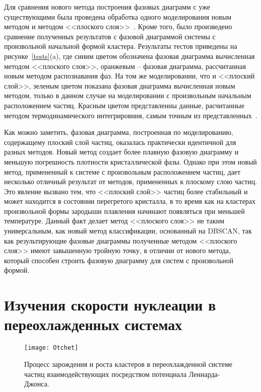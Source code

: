 Для сравнения нового метода построения фазовых диаграмм с уже существующими была проведена обработка одного моделирования новым методом и методом <<плоского слоя>>~\cite{10.1021/jp806127j, 10.1021/jp1117213}.
Кроме того, было произведено сравнение полученных результатов с фазовой диаграммой системы с произвольной начальной формой кластера.
Результаты тестов приведены на рисунке~\ref{tests}(a), где синим цветом обозначена фазовая диаграмма вычисленная методом <<плоского слоя>>, оранжевым -- фазовая диаграмма, рассчитанная новым методом распознавания фаз.
На том же моделировании, что и <<плоский слой>>, зеленым цветом показана фазовая диаграмма вычисленная новым методом, только в данном случае на моделировании с произвольным начальным расположением частиц.
Красным цветом представленны данные, расчитанные методом термодинамического интегрировния, самым точным из представленных~\cite{10.1080/00268976.2019.1699185}.

Как можно заметить, фазовая диаграмма, построенная по моделированию, содержащему плоский слой частиц, оказалась практически идентичной для разных методов.
Новый метод создает более плавную фазовую диаграмму и меньшую погрешность плотности кристаллической фазы.
Однако при этом новый метод, примененный к системе с произвольным расположением частиц, дает несколько отличный результат от методов, примененных к плоскому слою частиц.
Это явление вызвано тем, что <<плоский слой>> частиц более стабильный и может находится в состоянии перегретого кристалла, в то время как на кластерах произвольной формы зародыши плавления начинают появляться при меньшей температуре.
Данный факт делает метод <<плоского слоя>> не таким универсальным, как новый метод классификации, основанный на DBSCAN, так как результирующие фазовые диаграммы полученные методом <<плоского слоя>> имеют завышенную тройную точку, в отличии от нового метода, который способен строить фазовую диаграмму для систем с произвольной формой.


\section{Изучения скорости нуклеации в переохлажденных системах}
\label{PRIMe-SecNucleation}

\begin{figure}[!t]
    \centering
    \texttt{[image: Otchet]}
    \caption{Процесс зарождения и роста кластеров в переохлажденной системе частиц взаимодействующих посредством потенциала Леннарда-Джонса.}
    \label{otchet}
\end{figure}


